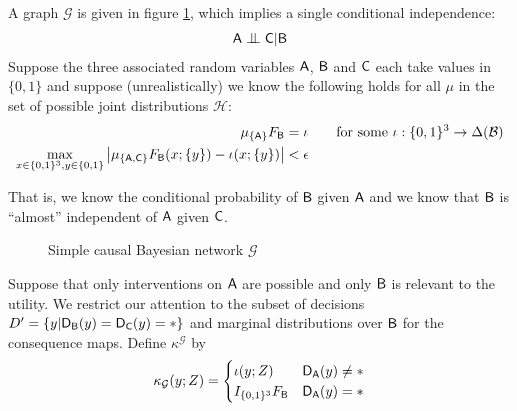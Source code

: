 \begin{example}\label{ex:extn_cbn}

A graph $\mathcal{G}$ is given in figure \ref{fig:simple_cbn}, which implies a single conditional independence:
\begin{align}
    \RV{A}\CI \RV{C}|\RV{B} \label{eq:g_ci}
\end{align}
Suppose the three associated random variables $\mathsf{A}$, $\mathsf{B}$ and $\mathsf{C}$ each take values in $\{0,1\}$ and suppose (unrealistically) we know the following holds for all $\mu$ in the set of possible joint distributions $\mathscr{H}$:
\begin{align}
    \mu_{\{\mathsf{A}\}} F_{\mathsf{B}} &= \iota \qquad \text{for some }\iota:\{0,1\}^3\to \Delta(\mathcal{B})\\
    \max_{x\in\{0,1\}^3,y\in\{0,1\}}\left|\mu_{\{\mathsf{A},\mathsf{C}\}} F_{\mathsf{B}}(x;\{y\}) - \iota(x;\{y\}) \right| &< \epsilon \label{eq:app_ci}
\end{align}

That is, we know the conditional probability of $\mathsf{B}$ given $\mathsf{A}$ and we know that $\mathsf{B}$ is ``almost'' independent of $\mathsf{A}$ given $\mathsf{C}$.

\begin{figure}
    \centering
    \caption{Simple causal Bayesian network $\mathcal{G}$}
    \label{fig:simple_cbn}
\end{figure}

Suppose that only interventions on $\mathsf{A}$ are possible and only $\mathsf{B}$ is relevant to the utility. We restrict our attention to the subset of decisions $D'=\{y|\mathsf{D}_{\mathsf{B}}(y)=\mathsf{D}_{\mathsf{C}}(y)=*\}$ and marginal distributions over $\mathsf{B}$ for the consequence maps. Define $\kappa^{\mathcal{G}}$ by
\begin{align}
    \kappa_{\mathcal{G}}(y;Z) = \begin{cases} \iota(y;Z) & \mathsf{D}_{\mathsf{A}}(y) \neq *\\
                                              I_{\{0,1\}^3} F_{\mathsf{B}} & \mathsf{D}_{\mathsf{A}}(y) = *\end{cases}
\end{align}


\end{example}
